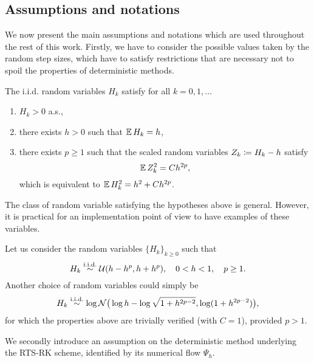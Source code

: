 \documentclass[final,onefignum,onetabnum]{siamonline171218}
\begin{document}
\subsection{Assumptions and notations} We now present the main assumptions and notations which are used throughout the rest of this work. Firstly, we have to consider the possible values taken by the random step sizes, which have to satisfy restrictions that are necessary not to spoil the properties of deterministic methods. 
\begin{assumption}\label{as:hStrong} The i.i.d. random variables $H_k$ satisfy for all $k = 0, 1, \ldots$
	\begin{enumerate}
		\item\label{as:hStrong_Pos} $H_k > 0$ a.s.,
		\item\label{as:hStrong_E} there exists $h > 0$ such that $\operatorname{\mathbb{E}} H_k = h$,
		\item\label{as:hStrong_Var} there exists $p \geq 1$ such that the scaled random variables $Z_k \coloneqq H_k - h$ satisfy
		\begin{equation}
		\operatorname{\mathbb{E}} Z_k^2 = Ch^{2p},
		\end{equation}
		which is equivalent to $\operatorname{\mathbb{E}} H_k^2 = h^2 + Ch^{2p}$.
	\end{enumerate}
\end{assumption}
The class of random variable satisfying the hypotheses above is general. However, it is practical for an implementation point of view to have examples of these variables.
\begin{example}\label{ex:uniformH} Let us consider the random variables $\{H_k\}_{k\geq 0}$ such that
	\begin{equation}
	H_k \stackrel{\text{i.i.d.}}{\sim} \mathcal{U}(h-h^p, h+h^p), \quad 0 < h < 1, \quad p \geq 1.
	\end{equation}
		Another choice of random variables could simply be 
	\begin{equation}
	H_k \stackrel{\text{i.i.d.}}{\sim} \log\mathcal{N}\big(\log h - \log\sqrt{1 + h^{2p - 2}}, \log(1 + h^{2p-2})\big),
	\end{equation}
	for which the properties above are trivially verified (with $C = 1$), provided $p > 1$.
\end{example}
We secondly introduce an assumption on the deterministic  method underlying the RTS-RK scheme, identified by its numerical flow $\Psi_h$. 
\end{document}
